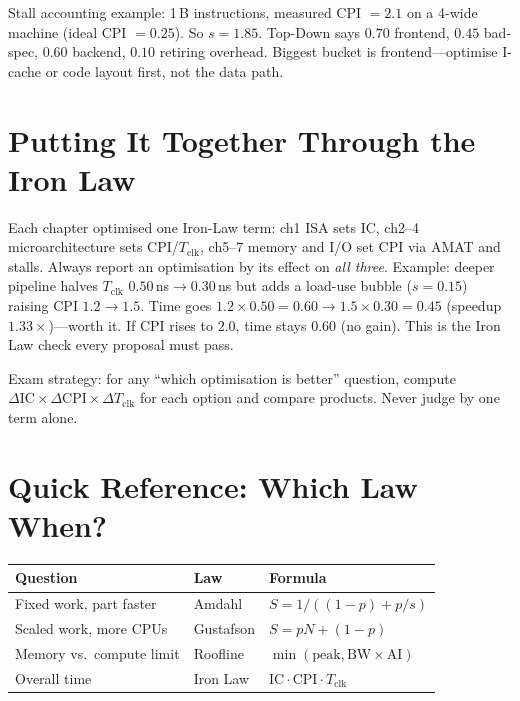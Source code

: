 Stall accounting example: 1\,B instructions, measured CPI $=2.1$ on a 4-wide
machine (ideal CPI $=0.25$). So $s=1.85$. Top-Down says $0.70$ frontend,
$0.45$ bad-spec, $0.60$ backend, $0.10$ retiring overhead. Biggest bucket is
frontend---optimise I-cache or code layout first, not the data path.

\section{Putting It Together Through the Iron Law}
Each chapter optimised one Iron-Law term: ch1 ISA sets IC, ch2--4
microarchitecture sets CPI/$T_{\text{clk}}$, ch5--7 memory and I/O set CPI via
AMAT and stalls. Always report an optimisation by its effect on \emph{all three}.
Example: deeper pipeline halves $T_{\text{clk}}$ $0.50$\,ns$\to0.30$\,ns but adds
a load-use bubble ($s=0.15$) raising CPI $1.2\to1.5$.
Time goes $1.2\times0.50=0.60\to1.5\times0.30=0.45$ (speedup $1.33\times$)---worth it.
If CPI rises to $2.0$, time stays $0.60$ (no gain).
This is the Iron Law check every proposal must pass.

Exam strategy: for any ``which optimisation is better'' question, compute
$\Delta\text{IC}\times\Delta\text{CPI}\times\Delta T_{\text{clk}}$ for each
option and compare products. Never judge by one term alone.

\section{Quick Reference: Which Law When?}
\begin{center}\small
\begin{tabular}{lll}
\toprule Question & Law & Formula\\ \midrule
Fixed work, part faster & Amdahl & $S=1/((1-p)+p/s)$\\
Scaled work, more CPUs & Gustafson & $S=pN+(1-p)$\\
Memory vs.\ compute limit & Roofline & $\min(\text{peak},\text{BW}\times\text{AI})$\\
Overall time & Iron Law & $\text{IC}\cdot\text{CPI}\cdot T_{\text{clk}}$\\
\bottomrule
\end{tabular}
\end{center}


